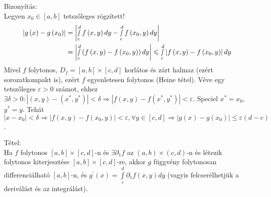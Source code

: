 \documentclass[12pt,a4paper]{scrartcl}
\newenvironment{tetel}{}{}
\newenvironment{bizonyitas}{}{}
\begin{document}
\begin{bizonyitas}

Bizonyítás:\\
Legyen \(x_{0} \in \left\lbrack {a,b} \right\rbrack\) tetszőleges
rögzített! \[\begin{aligned}
  \left| {g\left( x \right) - g\left( {{x_0}} \right)} \right| &  = \left| {\mathop \smallint \limits_c^d f\left( {x,y} \right)dy - \mathop \smallint \limits_c^d f\left( {{x_0},y} \right)dy} \right| \\ 
   &  = \left| {\mathop \smallint \limits_c^d \left( {f\left( {x,y} \right) - f\left( {{x_0},y} \right)} \right)dy} \right| \leqslant \mathop \smallint \limits_c^d \left| {f\left( {x,y} \right) - f\left( {{x_0},y} \right)} \right|dy \\ 
\end{aligned} \] Mivel \(f\) folytonos,
\(D_{f} = \left\lbrack {a,b} \right\rbrack \times \left\lbrack {c,d} \right\rbrack\)
korlátos és zárt halmaz (ezért sorozatkompakt is), ezért \(f\)
egyenletesen folytonos (Heine tétel). Véve egy tetszőleges
\(\varepsilon > 0\) számot, ehhez
\(\left. \exists\delta > 0:\left| {\left( {x,y} \right) - \left( {x^{\ast},y^{\ast}} \right)} \right| < \delta\Rightarrow\left| {f\left( {x,y} \right) - f\left( {x^{\ast},y^{\ast}} \right)} \right| < \varepsilon \right.\).
Speciel \(x^{\ast} = x_{0}\), \(y^{\ast} = y\). Tehát
\[\left. \left| {x - x_{0}} \right| < \delta\Rightarrow\left| {f\left( {x,y} \right) - f\left( {x_{0},y} \right)} \right| < \varepsilon,\forall y \in \left\lbrack {c,d} \right\rbrack\Rightarrow\left| {g\left( x \right) - g\left( x_{0} \right)} \right| \leq \varepsilon\left( {d - c} \right) \right.\].

\end{bizonyitas}

\begin{tetel}

Tétel:\\
Ha \(f\) folytonos
\(\left\lbrack {a,b} \right\rbrack \times \left\lbrack {c,d} \right\rbrack\)-n
és \(\exists\partial_{1}f\) az
\(\left( {a,b} \right) \times \left( {c,d} \right)\)-n és létezik
folytonos kiterjesztése
\(\left\lbrack {a,b} \right\rbrack \times \left\lbrack {c,d} \right\rbrack\)-re,
akkor \(g\) függvény folytonosan differenciálható
\(\left\lbrack {a,b} \right\rbrack\)-n, és
\(g^{\prime}\left( x \right) = {\int\limits_{c}^{d}{\partial_{1}f\left( {x,y} \right)dy}}\)
(vagyis felcserélhetjük a deriválást és az integrálást).

\end{tetel}
\end{document}

